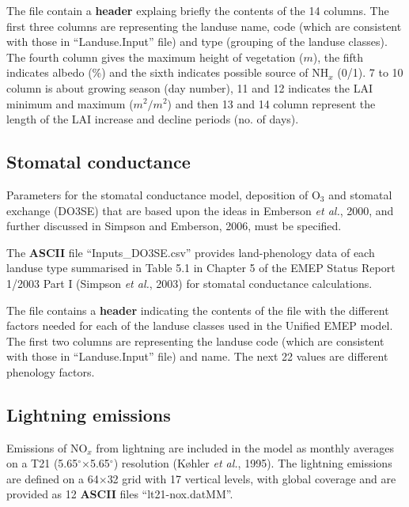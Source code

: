 The file contain a {\bf header} explaing briefly the contents of the 
14 columns. 
The first three columns are representing the landuse name, code (which
are consistent with those in ``Landuse.Input'' file) and
type (grouping of the landuse classes). The fourth column gives
the maximum height of vegetation ($m$), the fifth indicates albedo (\%) and
the sixth indicates possible source of NH$_{x}$ (0/1). 7 to 10
column is about growing season (day number), 11 and 12 indicates the
LAI minimum  and maximum ($m^{2}/m^{2}$) and then 13 and 14 column
represent the length of the LAI increase and decline periods (no. of days).


\subsection{Stomatal conductance}
Parameters for the stomatal conductance model, deposition of O$_{3}$ and
stomatal exchange (DO3SE) that are based upon the ideas in
Emberson {\sl et al.}, 2000, and further discussed in Simpson and Emberson,
2006, must be specified.  

The {\bf ASCII} file ``Inputs\_DO3SE.csv'' provides land-phenology data
of each landuse type summarised in Table 5.1 in Chapter 5 of the EMEP 
Status Report 1/2003 Part I (Simpson {\sl et al.}, 2003) for stomatal
conductance calculations.

The file contains a {\bf header} indicating the contents of the file
with the different factors needed for each of the landuse classes used
in the Unified EMEP model. The first two columns are representing the
landuse code (which are consistent with those in ``Landuse.Input'' file)
and name. The next 22 values are different phenology factors.

\subsection{Lightning emissions}
Emissions of NO$_{x}$ from lightning are included in the model
as monthly averages on a T21 (5.65$^{\circ}$$\times$5.65$^{\circ}$) resolution (K{\o}hler {\sl et al.}, 1995). 
The lightning emissions are defined on a 64$\times$32 grid with 17 vertical
levels, with global coverage and are provided as 12 {\bf ASCII} files
``lt21-nox.datMM''.




